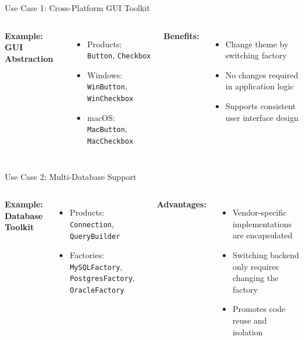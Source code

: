 \documentclass[aspectratio=169, table]{beamer}
\begin{document}
\begin{frame}[fragile]{Use Case 1: Cross-Platform GUI Toolkit}
\vspace{5pt}
\begin{columns}[T]
\textbf{Example: GUI Abstraction}
\begin{itemize}
\item Products: \texttt{Button}, \texttt{Checkbox}
\item Windows: \texttt{WinButton}, \texttt{WinCheckbox}
\item macOS: \texttt{MacButton}, \texttt{MacCheckbox}
\end{itemize}

\textbf{Benefits:}
\begin{itemize}
\item Change theme by switching factory
\item No changes required in application logic
\item Supports consistent user interface design
\end{itemize}
\end{columns}
\end{frame}

\begin{frame}[fragile]{Use Case 2: Multi-Database Support}
\vspace{5pt}
\begin{columns}[T]
\textbf{Example: Database Toolkit}
\begin{itemize}
\item Products: \texttt{Connection}, \texttt{QueryBuilder}
\item Factories: \texttt{MySQLFactory}, \texttt{PostgresFactory}, \texttt{OracleFactory}
\end{itemize}

\textbf{Advantages:}
\begin{itemize}
\item Vendor-specific implementations are encapsulated
\item Switching backend only requires changing the factory
\item Promotes code reuse and isolation
\end{itemize}
\end{columns}
\end{frame}
\end{document}
